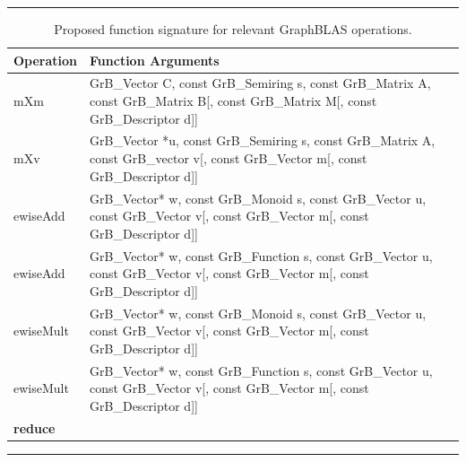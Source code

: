\documentclass[11pt]{extarticle}
\begin{document}
\begin{table}
\hrule
\begin{center}
\caption{Proposed function signature for relevant GraphBLAS operations.}
\label{Tab:OperatorInputType}
\begin{tabularx}{\textwidth}{l|X}
Operation	& Function Arguments \\ \hline
mXm	 & GrB\_Vector C, const GrB\_Semiring s, const GrB\_Matrix A, const GrB\_Matrix B[, const GrB\_Matrix M[, const GrB\_Descriptor d]]\\
mXv & GrB\_Vector *u, const GrB\_Semiring s, const GrB\_Matrix A, 
                 const GrB\_vector v[, const GrB\_Vector m[, const GrB\_Descriptor d]] \\
ewiseAdd & GrB\_Vector* w, const GrB\_Monoid s, const GrB\_Vector u,
const GrB\_Vector v[, const GrB\_Vector m[, const GrB\_Descriptor d]] \\
ewiseAdd & GrB\_Vector* w, const GrB\_Function s, const GrB\_Vector u,
const GrB\_Vector v[, const GrB\_Vector m[, const GrB\_Descriptor d]] \\
ewiseMult & GrB\_Vector* w, const GrB\_Monoid s, const GrB\_Vector u,
const GrB\_Vector v[, const GrB\_Vector m[, const GrB\_Descriptor d]] \\
ewiseMult & GrB\_Vector* w, const GrB\_Function s, const GrB\_Vector u,
const GrB\_Vector v[, const GrB\_Vector m[, const GrB\_Descriptor d]] \\
\textbf{reduce} & \\
\end{tabularx}
\end{center}
\hrule
\end{table}

\def\IEEEbibitemsep{3pt plus .5pt}


\end{document}
